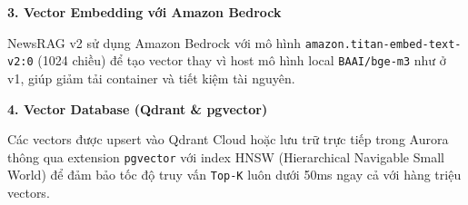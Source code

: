\textbf{3. Vector Embedding với Amazon Bedrock}

NewsRAG v2 sử dụng Amazon Bedrock với mô hình
\texttt{amazon.titan-embed-text-v2:0} (1024 chiều) để tạo vector thay vì
host mô hình local \texttt{BAAI/bge-m3} như ở v1, giúp giảm tải
container và tiết kiệm tài nguyên.

\begin{Shaded}
\begin{Highlighting}[]

\OperatorTok{=}\OperatorTok{=}\NormalTok{)}

\OperatorTok{=}
\OperatorTok{=}
\OperatorTok{=}\NormalTok{,}
\OperatorTok{=}\NormalTok{,}
\OperatorTok{=}\NormalTok{,}
\OperatorTok{=}
\NormalTok{    )}
\OperatorTok{=}
    \NormalTok{)}
\end{Highlighting}
\end{Shaded}

\textbf{4. Vector Database (Qdrant \& pgvector)}

Các vectors được upsert vào Qdrant Cloud hoặc lưu trữ trực tiếp trong
Aurora thông qua extension \texttt{pgvector} với index HNSW
(Hierarchical Navigable Small World) để đảm bảo tốc độ truy vấn
\texttt{Top-K} luôn dưới 50ms ngay cả với hàng triệu vectors.
